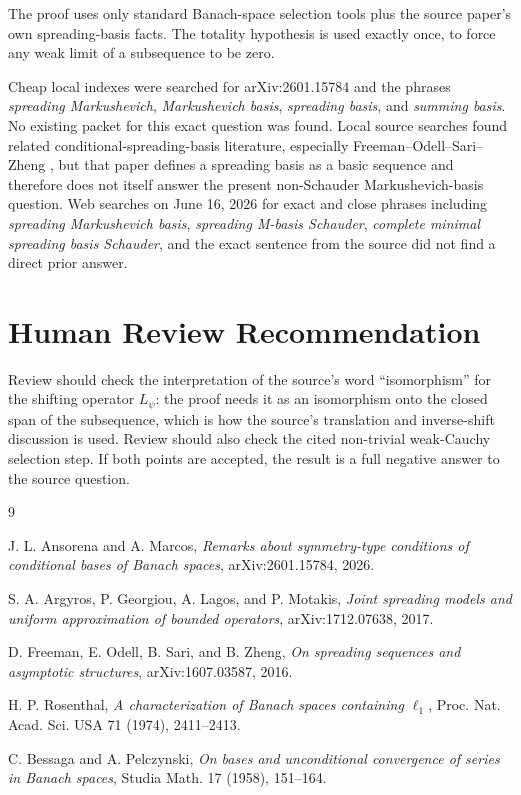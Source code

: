 \documentclass[11pt]{article}
\begin{document}
The proof uses only standard Banach-space selection tools plus the source
paper's own spreading-basis facts. The totality hypothesis is used exactly once,
to force any weak limit of a subsequence to be zero.

Cheap local indexes were searched for arXiv:2601.15784 and the phrases
\emph{spreading Markushevich}, \emph{Markushevich basis}, \emph{spreading
basis}, and \emph{summing basis}. No existing packet for this exact question
was found. Local source searches found related conditional-spreading-basis
literature, especially Freeman--Odell--Sari--Zheng \cite{FOSZ}, but that paper
defines a spreading basis as a basic sequence and therefore does not itself
answer the present non-Schauder Markushevich-basis question. Web searches on
June 16, 2026 for exact and close phrases including \emph{spreading
Markushevich basis}, \emph{spreading M-basis Schauder}, \emph{complete minimal
spreading basis Schauder}, and the exact sentence from the source did not find
a direct prior answer.

\section*{Human Review Recommendation}

Review should check the interpretation of the source's word ``isomorphism'' for
the shifting operator \(L_\psi\): the proof needs it as an isomorphism onto the
closed span of the subsequence, which is how the source's translation and
inverse-shift discussion is used. Review should also check the cited
non-trivial weak-Cauchy selection step. If both points are accepted, the result
is a full negative answer to the source question.

\begin{thebibliography}{9}

J. L. Ansorena and A. Marcos,
\emph{Remarks about symmetry-type conditions of conditional bases of Banach spaces},
arXiv:2601.15784, 2026.

S. A. Argyros, P. Georgiou, A. Lagos, and P. Motakis,
\emph{Joint spreading models and uniform approximation of bounded operators},
arXiv:1712.07638, 2017.

D. Freeman, E. Odell, B. Sari, and B. Zheng,
\emph{On spreading sequences and asymptotic structures},
arXiv:1607.03587, 2016.

H. P. Rosenthal,
\emph{A characterization of Banach spaces containing \(\ell_1\)},
Proc. Nat. Acad. Sci. USA 71 (1974), 2411--2413.

C. Bessaga and A. Pelczynski,
\emph{On bases and unconditional convergence of series in Banach spaces},
Studia Math. 17 (1958), 151--164.

\end{thebibliography}
\end{document}
